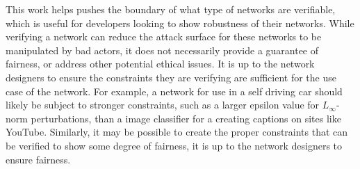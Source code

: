 \documentclass{llncs}
\begin{document}
This work helps pushes the boundary of what type of networks are verifiable, which is useful for developers looking to show robustness of their networks.
While verifying a network can reduce the attack surface for these networks to be manipulated by bad actors, it does not necessarily provide a guarantee of fairness, or address other potential ethical issues.
It is up to the network designers to ensure the constraints they are verifying are sufficient for the use case of the network.
For example, a network for use in a self driving car should likely be subject to stronger constraints, such as a larger epsilon value for $L_\infty$-norm perturbations, than a image classifier for a creating captions on sites like YouTube.
Similarly, it may be possible to create the proper constraints that can be verified to show some degree of fairness, it is up to the network designers to ensure fairness.

\clearpage



\end{document}
